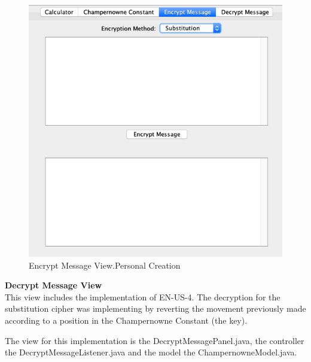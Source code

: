 \documentclass{report}
\begin{document}
\begin{figure}[H]
\centering
\includegraphics[scale=0.5]{images/EncryptMessage.png}
\caption[Encrypt Message View]{Encrypt Message View.Personal Creation}
\end{figure}

\textbf{Decrypt Message View} \\

This view includes the implementation of EN-US-4. The decryption for the substitution cipher was implementing by reverting the movement previously made according to a position in the Champernowne Constant (the key). 

The view for this implementation is the DecryptMessagePanel.java, the controller the DecryptMessageListener.java and the model the ChampernowneModel.java.
\end{document}
